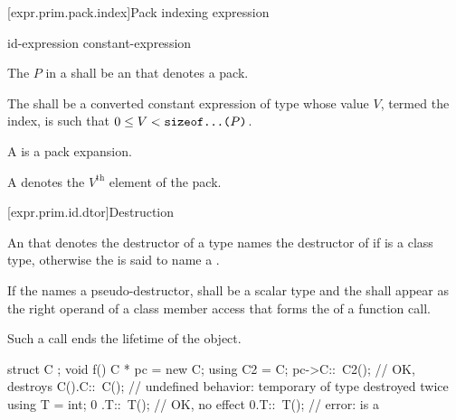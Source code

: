 [expr.prim.pack.index]{Pack indexing expression}

\begin{bnf}
\br
    id-expression  \terminal{[} constant-expression \terminal{]}
\end{bnf}

\pnum
The  $P$ in a 
shall be an  that denotes a pack.

\pnum
The  shall be
a converted constant expression of type 
whose value $V$, termed the index,
is such that $0 \le V < \texttt{\protect sizeof...($P$)}$.

\pnum
A  is a pack expansion.

\pnum
\begin{note}
A  denotes
the $V^\text{th}$ element of the pack.
\end{note}

[expr.prim.id.dtor]{Destruction}

\pnum
{}%
%
An  that denotes the destructor of a type 
names the destructor of 
if  is a class type,
otherwise the  is said
to name a .

\pnum
If the  names a pseudo-destructor,
 shall be a scalar type and
the  shall appear
as the right operand of a class member access that forms
the  of a function call.
\begin{note}
Such a call ends the lifetime of the object.
\end{note}

\pnum
\begin{example}
\begin{codeblock}
struct C { };
void f() {
  C * pc = new C;
  using C2 = C;
  pc->C::~C2();     // OK, destroys 
  C().C::~C();      // undefined behavior: temporary of type  destroyed twice
  using T = int;
  0 .T::~T();       // OK, no effect
  0.T::~T();        // error:  is a 
}
\end{codeblock}
\end{example}

